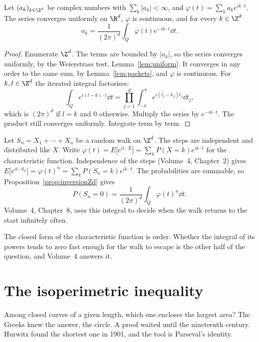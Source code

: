 \begin{proposition}\label{prop:inversionZd}
Let $(a_k)_{k\in\Z^d}$ be complex numbers with $\sum_k|a_k|<\infty$, and $\varphi(t)=\sum_ka_ke^{ik\cdot t}$. The series converges uniformly on $\R^d$,
$\varphi$ is continuous, and for every $k\in\Z^d$
\[
a_k=\frac1{(2\pi)^d}\int_Q\varphi(t)e^{-ik\cdot t}\dd t.
\]
\end{proposition}
\begin{proof}
Enumerate $\Z^d$. The terms are bounded by $|a_k|$, so the series converges uniformly, by the Weierstrass test, Lemma~\ref{lem:uniform}. It converges in any order to the same sum, by Lemma~\ref{lem:packets}, and $\varphi$ is continuous. For $k,l\in\Z^d$ the iterated integral factorises:
\[
\int_Qe^{i(l-k)\cdot t}\dd t=\prod_{j=1}^d\int_{-\pi}^\pi e^{i(l_j-k_j)t_j}\dd t_j,
\]
which is $(2\pi)^d$ if $l=k$ and $0$ otherwise. Multiply the series by $e^{-ik\cdot t}$. The product still converges uniformly. Integrate term by term.
\end{proof}

\begin{example}
Let $S_n=X_1+\cdots+X_n$ be a random walk on $\Z^d$. The steps are independent and distributed like $X$. Write $\varphi(t)=E\bigl[e^{it\cdot X}\bigr]=\sum_kP(X=k)e^{ik\cdot t}$ for the characteristic function. Independence of the steps (Volume~4, Chapter~2) gives $E\bigl[e^{it\cdot S_n}\bigr]=\varphi(t)^n=\sum_kP(S_n=k)e^{ik\cdot t}$. The probabilities are summable, so Proposition~\ref{prop:inversionZd} gives
\[
P(S_n=0)=\frac1{(2\pi)^d}\int_Q\varphi(t)^n\dd t.
\]
Volume~4, Chapter~8, uses this integral to decide when the walk returns to the start infinitely often.
\end{example}

The closed form of the characteristic function is order. Whether the integral of its powers tends to zero fast enough for the walk to escape is the other half of the question, and Volume~4 answers it.

\section{The isoperimetric inequality}

Among closed curves of a given length, which one encloses the largest area? The Greeks knew the answer, the circle. A proof waited until the nineteenth century. Hurwitz found the shortest one in 1901, and the tool is Parseval's identity.

